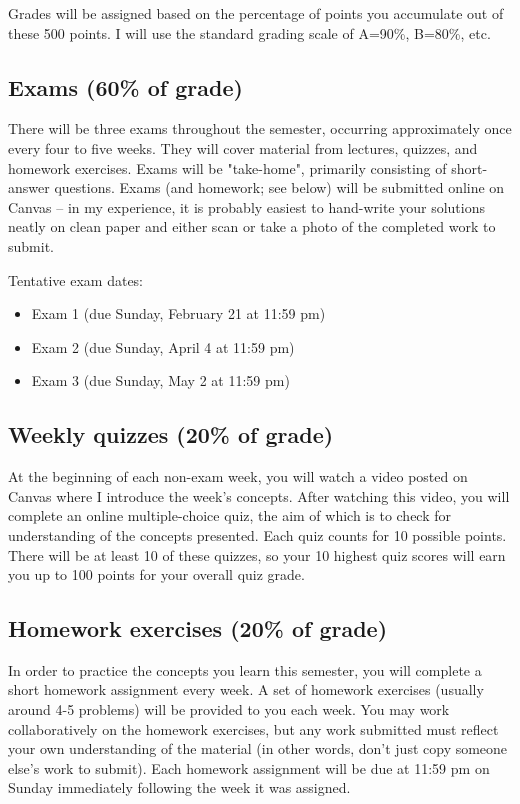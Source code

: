 \documentclass[10pt]{article}
\begin{document}
Grades will be assigned based on the percentage of points you accumulate out of these 500 points.  I will use the standard grading scale of A=90\%, B=80\%, etc.

\subsection*{Exams (60\% of grade)}
\label{sec:orgbd58584}
There will be three exams throughout the semester, occurring approximately once every four to five weeks.  They will cover material from lectures, quizzes, and homework exercises. Exams will be "take-home", primarily consisting of short-answer questions. Exams (and homework; see below) will be submitted online on Canvas -- in my experience, it is probably easiest to hand-write your solutions neatly on clean paper and either scan or take a photo of the completed work to submit. 

Tentative exam dates:

\begin{itemize}
\item Exam 1 (due Sunday, February 21 at 11:59 pm)
\item Exam 2 (due Sunday, April 4 at 11:59 pm)
\item Exam 3 (due Sunday, May 2 at 11:59 pm)
\end{itemize}

\subsection*{Weekly quizzes (20\% of grade)}
\label{sec:orgcbb32fd}

At the beginning of each non-exam week, you will watch a video posted on Canvas where I introduce the week's concepts. After watching this video, you will complete an online multiple-choice quiz, the aim of which is to check for understanding of the concepts presented. Each quiz counts for 10 possible points. There will be at least 10 of these quizzes, so your 10 highest quiz scores will earn you up to 100 points for your overall quiz grade.

\subsection*{Homework exercises (20\% of grade)}
\label{sec:org067805f}
In order to practice the concepts you learn this semester, you will complete a short homework assignment every week. A set of homework exercises (usually around 4-5 problems) will be provided to you each week. You may work collaboratively on the homework exercises, but any work submitted must reflect your own understanding of the material (in other words, don't just copy someone else's work to submit).  Each homework assignment will be due at 11:59 pm on Sunday immediately following the week it was assigned.
\end{document}
